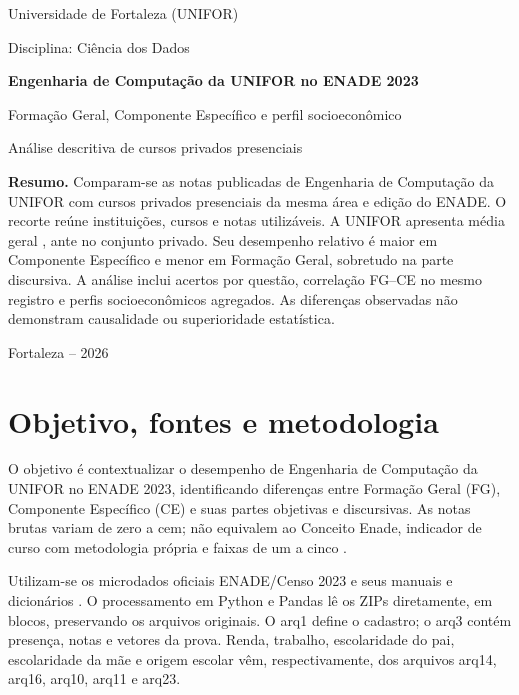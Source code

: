 \documentclass[12pt,a4paper]{article}
\begin{document}
\begin{titlepage}
\centering
{\large Universidade de Fortaleza (UNIFOR)\par}
\vspace{0.4cm}
{\large Disciplina: Ciência dos Dados\par}
\vfill
{\LARGE\bfseries Engenharia de Computação da UNIFOR no ENADE 2023\par}
\vspace{0.8cm}
{\Large Formação Geral, Componente Específico e perfil socioeconômico\par}
\vspace{0.6cm}
{\large Análise descritiva de cursos privados presenciais\par}
\vfill
\begin{minipage}{.92\textwidth}
\textbf{Resumo.} Comparam-se as notas publicadas de Engenharia de Computação
da UNIFOR com cursos privados presenciais da mesma área e edição do ENADE.
O recorte reúne \TotalIES{} instituições, \TotalCursos{} cursos e
\TotalNotas{} notas utilizáveis. A UNIFOR apresenta média geral
\MediaUniforGeral{}, ante \MediaPrivadasGeral{} no conjunto privado.
Seu desempenho relativo é maior em Componente Específico e menor em Formação
Geral, sobretudo na parte discursiva. A análise inclui acertos por questão,
correlação FG--CE no mesmo registro e perfis socioeconômicos agregados.
As diferenças observadas não demonstram causalidade ou superioridade estatística.
\end{minipage}
\vfill
Fortaleza -- 2026
\end{titlepage}
\setcounter{page}{2}

\section{Objetivo, fontes e metodologia}
O objetivo é contextualizar o desempenho de Engenharia de Computação da UNIFOR
no ENADE 2023, identificando diferenças entre Formação Geral (FG), Componente
Específico (CE) e suas partes objetivas e discursivas. As notas brutas variam
de zero a cem; não equivalem ao Conceito Enade, indicador de curso com metodologia
própria e faixas de um a cinco \cite{conceito}.

Utilizam-se os microdados oficiais ENADE/Censo 2023 e seus manuais e dicionários
\cite{enade,censo,manual}. O processamento em Python e Pandas lê os ZIPs
diretamente, em blocos, preservando os arquivos originais. O arq1 define o
cadastro; o arq3 contém presença, notas e vetores da prova. Renda, trabalho,
escolaridade do pai, escolaridade da mãe e origem escolar vêm, respectivamente,
dos arquivos arq14, arq16, arq10, arq11 e arq23.
\end{document}
